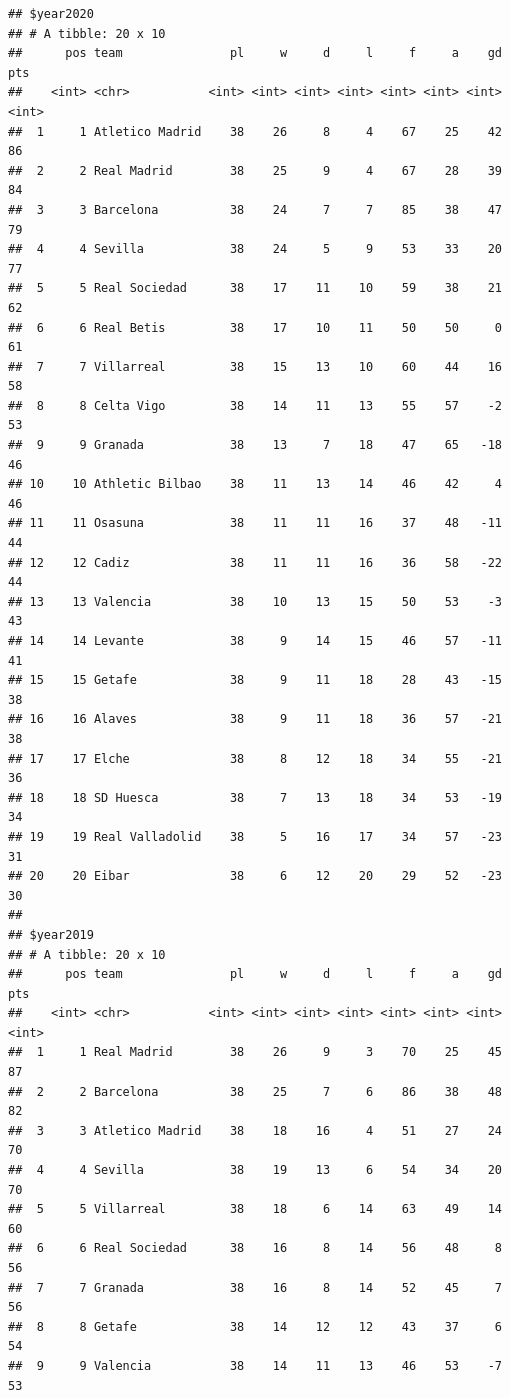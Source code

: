 \documentclass[]{tufte-handout}
\begin{document}
\begin{verbatim}
## $year2020
## # A tibble: 20 x 10
##      pos team               pl     w     d     l     f     a    gd   pts
##    <int> <chr>           <int> <int> <int> <int> <int> <int> <int> <int>
##  1     1 Atletico Madrid    38    26     8     4    67    25    42    86
##  2     2 Real Madrid        38    25     9     4    67    28    39    84
##  3     3 Barcelona          38    24     7     7    85    38    47    79
##  4     4 Sevilla            38    24     5     9    53    33    20    77
##  5     5 Real Sociedad      38    17    11    10    59    38    21    62
##  6     6 Real Betis         38    17    10    11    50    50     0    61
##  7     7 Villarreal         38    15    13    10    60    44    16    58
##  8     8 Celta Vigo         38    14    11    13    55    57    -2    53
##  9     9 Granada            38    13     7    18    47    65   -18    46
## 10    10 Athletic Bilbao    38    11    13    14    46    42     4    46
## 11    11 Osasuna            38    11    11    16    37    48   -11    44
## 12    12 Cadiz              38    11    11    16    36    58   -22    44
## 13    13 Valencia           38    10    13    15    50    53    -3    43
## 14    14 Levante            38     9    14    15    46    57   -11    41
## 15    15 Getafe             38     9    11    18    28    43   -15    38
## 16    16 Alaves             38     9    11    18    36    57   -21    38
## 17    17 Elche              38     8    12    18    34    55   -21    36
## 18    18 SD Huesca          38     7    13    18    34    53   -19    34
## 19    19 Real Valladolid    38     5    16    17    34    57   -23    31
## 20    20 Eibar              38     6    12    20    29    52   -23    30
## 
## $year2019
## # A tibble: 20 x 10
##      pos team               pl     w     d     l     f     a    gd   pts
##    <int> <chr>           <int> <int> <int> <int> <int> <int> <int> <int>
##  1     1 Real Madrid        38    26     9     3    70    25    45    87
##  2     2 Barcelona          38    25     7     6    86    38    48    82
##  3     3 Atletico Madrid    38    18    16     4    51    27    24    70
##  4     4 Sevilla            38    19    13     6    54    34    20    70
##  5     5 Villarreal         38    18     6    14    63    49    14    60
##  6     6 Real Sociedad      38    16     8    14    56    48     8    56
##  7     7 Granada            38    16     8    14    52    45     7    56
##  8     8 Getafe             38    14    12    12    43    37     6    54
##  9     9 Valencia           38    14    11    13    46    53    -7    53

\end{verbatim}
\end{document}
